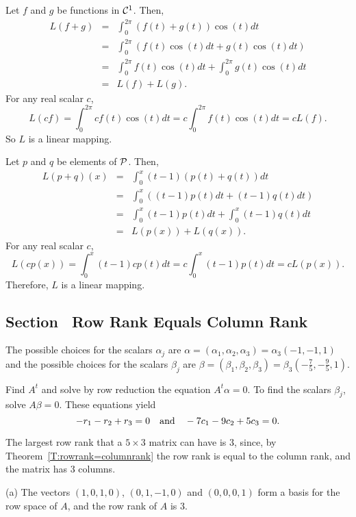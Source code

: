 Let $f$ and $g$ be functions in ${\cal C}^1$.  Then,
\[ \begin{array}{rcl}
 L(f + g) & = & \int_0^{2\pi}(f(t) + g(t))\cos(t)dt \\
& = & \int_0^{2\pi}(f(t)\cos(t)dt + g(t)\cos(t)dt) \\
& = & \int_0^{2\pi}f(t)\cos(t)dt + \int_0^{2\pi}g(t)\cos(t)dt \\
& = & L(f) + L(g). \end{array} \]
For any real scalar $c$,
\[ L(cf) = \int_0^{2\pi}cf(t)\cos(t)dt = c\int_0^{2\pi}f(t)\cos(t)dt
= cL(f). \]
So $L$ is a linear mapping.

Let $p$ and $q$ be elements of ${\cal P}$.  Then,
\[ \begin{array}{rcl}
L(p + q)(x) & = & \int_0^x(t - 1)(p(t) + q(t))dt \\
& = & \int_0^x((t - 1)p(t)dt + (t - 1)q(t)dt) \\
& = & \int_0^x(t - 1)p(t)dt + \int_0^x(t - 1)q(t)dt \\
& = & L(p(x)) + L(q(x)). \end{array} \]
For any real scalar $c$,
\[ L(cp(x)) = \int_0^x(t - 1)cp(t)dt = c\int_0^x(t - 1)p(t)dt
= cL(p(x)). \]
Therefore, $L$ is a linear mapping.



\newpage
\subsection*{Section~\protect{\ref{S:5.8}} Row Rank Equals Column Rank}

\ans The possible choices for the scalars $\alpha_j$ are
$\alpha = (\alpha_1,\alpha_2,\alpha_3) = \alpha_3(-1,-1,1)$ and
the possible choices for the scalars $\beta_j$ are $\beta = 
(\beta_1,\beta_2,\beta_3) = \beta_3(-\frac{7}{5},-\frac{9}{5},1)$.

\soln Find $A^t$ and solve by row reduction the equation
$A^t\alpha = 0$.  To find the scalars $\beta_j$, solve $A\beta =
0$.  These equations yield
\[
-r_1 - r_2 + r_3 = 0 \quad\mbox{and}\quad -7c_1 - 9c_2 + 5c_3 = 0.
\]

 The largest row rank that a $5 \times 3$ matrix can have
is $3$, since, by Theorem~\ref{T:rowrank=columnrank} the row rank is
equal to the column rank, and the matrix has $3$ columns.

(a) \ans The vectors $(1,0,1,0)$, $(0,1,-1,0)$ and $(0,0,0,1)$ form a
basis for the row space of $A$, and the row rank of $A$ is $3$.

